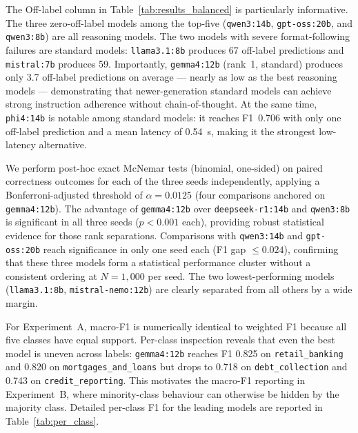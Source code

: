 \documentclass[10pt,a4paper,twocolumn]{article}
\begin{document}
The Off-label column in Table~\ref{tab:results_balanced} is
particularly informative. The three zero-off-label models among
the top-five (\texttt{qwen3:14b}, \texttt{gpt-oss:20b}, and
\texttt{qwen3:8b}) are all reasoning models. The two models
with severe format-following failures are standard models:
\texttt{llama3.1:8b} produces 67 off-label predictions and
\texttt{mistral:7b} produces 59. Importantly, \texttt{gemma4:12b}
(rank~1, standard) produces only 3.7 off-label predictions on average
--- nearly as low as the best reasoning models --- demonstrating
that newer-generation standard models can achieve strong instruction
adherence without chain-of-thought. At the same time, \texttt{phi4:14b}
is notable among standard models: it reaches F1~0.706 with only one
off-label prediction and a mean latency of 0.54~s, making it the
strongest low-latency alternative.

We perform post-hoc exact McNemar tests (binomial, one-sided) on
paired correctness outcomes for each of the three seeds independently,
applying a Bonferroni-adjusted threshold of $\alpha{=}0.0125$ (four
comparisons anchored on \texttt{gemma4:12b}).
The advantage of \texttt{gemma4:12b} over \texttt{deepseek-r1:14b} and
\texttt{qwen3:8b} is significant in all three seeds ($p{<}0.001$ each),
providing robust statistical evidence for those rank separations.
Comparisons with \texttt{qwen3:14b} and \texttt{gpt-oss:20b} reach
significance in only one seed each (F1 gap $\leq 0.024$), confirming
that these three models form a statistical performance cluster without
a consistent ordering at $N{=}1{,}000$ per seed. The two lowest-performing
models (\texttt{llama3.1:8b}, \texttt{mistral-nemo:12b}) are clearly
separated from all others by a wide margin.

For Experiment~A, macro-F1 is numerically identical to weighted F1
because all five classes have equal support. Per-class inspection
reveals that even the best model is uneven across labels:
\texttt{gemma4:12b} reaches F1 0.825 on \texttt{retail\_banking} and
0.820 on \texttt{mortgages\_and\_loans} but drops to 0.718 on
\texttt{debt\_collection} and 0.743 on \texttt{credit\_reporting}.
This motivates the macro-F1 reporting in Experiment~B, where
minority-class behaviour can otherwise be hidden by the majority class.
Detailed per-class F1 for the leading models are reported in
Table~\ref{tab:per_class}.
\end{document}
